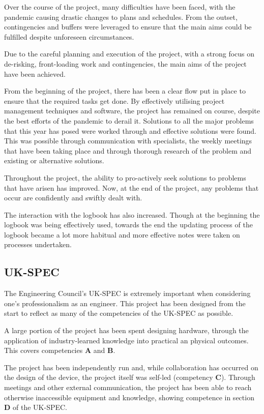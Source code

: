 Over the course of the project, many difficulties have been faced, with the pandemic causing drastic changes to plans and schedules. From the outset, contingencies and buffers were leveraged to ensure that the main aims could be fulfilled despite unforeseen circumstances.

Due to the careful planning and execution of the project, with a strong focus on de-risking, front-loading work and contingencies, the main aims of the project have been achieved.

From the beginning of the project, there has been a clear flow put in place to ensure that the required tasks get done. By effectively utilising project management techniques and software, the project has remained on course, despite the best efforts of the pandemic to derail it. Solutions to all the major problems that this year has posed were worked through and effective solutions were found. This was possible through communication with specialists, the weekly meetings that have been taking place and through thorough research of the problem and existing or alternative solutions.

Throughout the project, the ability to pro-actively seek solutions to problems that have arisen has improved. Now, at the end of the project, any problems that occur are confidently and swiftly dealt with. 

The interaction with the logbook has also increased. Though at the beginning the logbook was being effectively used, towards the end the updating process of the logbook became a lot more habitual and more effective notes were taken on processes undertaken.

\subsection{UK-SPEC}

The Engineering Council's UK-SPEC is extremely important when considering one's professionalism as an engineer. This project has been designed from the start to reflect as many of the competencies of the UK-SPEC as possible. 

A large portion of the project has been spent designing hardware, through the application of industry-learned knowledge into practical an physical outcomes. This covers competencies \textbf{A} and \textbf{B}.

The project has been independently run and, while collaboration has occurred on the design of the device, the project itself was self-led (competency \textbf{C}). Through meetings and other external communication, the project has been able to reach otherwise inaccessible equipment and knowledge, showing competence in section \textbf{D} of the UK-SPEC.

